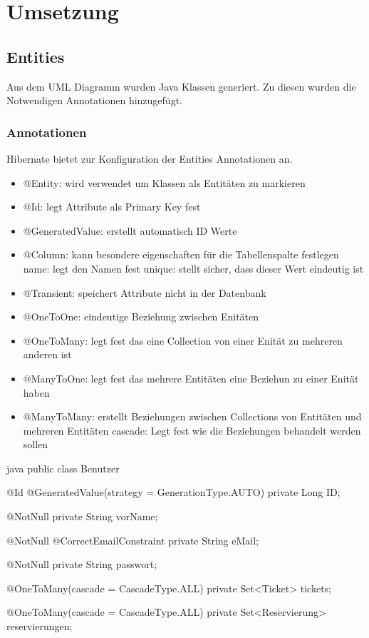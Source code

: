\section{Umsetzung}

\subsection{Entities}

Aus dem UML Diagramm wurden Java Klassen generiert. Zu diesen wurden die Notwendigen Annotationen hinzugefügt. 

\subsubsection{Annotationen}

	Hibernate bietet zur Konfiguration der Entities Annotationen an. 
	
	\begin{itemize}
		\item[] @Entity: wird verwendet um Klassen als Entitäten zu markieren
		\item[] @Id: legt Attribute als Primary Key fest
		\item[] @GeneratedValue: erstellt automatisch ID Werte
		\item[] @Column: kann besondere eigenschaften für die Tabellenspalte festlegen
		\subitem name: legt den Namen fest
		\subitem unique: stellt sicher, dass dieser Wert eindeutig ist
		\item[] @Transient: speichert Attribute nicht in der Datenbank
		\item[] @OneToOne: eindeutige Beziehung zwischen Enitäten
		\item[] @OneToMany: legt fest das eine Collection von einer Enität zu mehreren anderen ist
		\item[] @ManyToOne: legt fest das mehrere Entitäten eine Beziehun zu einer Enität haben
		\item[] @ManyToMany: erstellt Beziehungen zwischen Collections von Entitäten und mehreren Entitäten
		\subitem cascade: Legt fest wie die Beziehungen behandelt werden sollen
		  
	\end{itemize}

	\begin{code}[]{java}
	public class Benutzer {
		
		@Id
		@GeneratedValue(strategy = GenerationType.AUTO)
		private Long ID;
		
		@NotNull
		private String vorName;
		
		@NotNull
		@CorrectEmailConstraint
		private String eMail;
		
		@NotNull
		private String passwort;
		
		@OneToMany(cascade = CascadeType.ALL)
		private Set<Ticket> tickets;
		
		@OneToMany(cascade = CascadeType.ALL)
		private Set<Reservierung> reservierungen;
	}
	\end{code}

